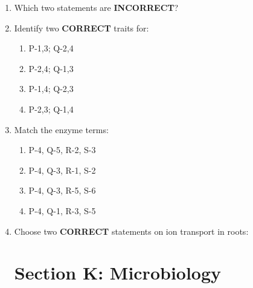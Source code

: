 \documentclass[journal]{IEEEtran}
\begin{document}
\begin{enumerate}
\item Which two statements are \textbf{INCORRECT}?\hfill  \textit{}
\begin{enumerate}
\end{enumerate}

\item Identify two \textbf{CORRECT} traits for:\hfill  \textit{}
\begin{enumerate}
    \item P-1,3; Q-2,4
    \item P-2,4; Q-1,3
    \item P-1,4; Q-2,3
    \item P-2,3; Q-1,4
\end{enumerate}

\item Match the enzyme terms:\hfill  \textit{}
\begin{enumerate}
    \item P-4, Q-5, R-2, S-3
    \item P-4, Q-3, R-1, S-2
    \item P-4, Q-3, R-5, S-6
    \item P-4, Q-1, R-3, S-5
\end{enumerate}

\item Choose two \textbf{CORRECT} statements on ion transport in roots:\hfill  \textit{}
\begin{enumerate}
\end{enumerate}

\clearpage
\section*{Section K: Microbiology}
\setcounter{enumi}{0}

\end{enumerate}
\end{document}
